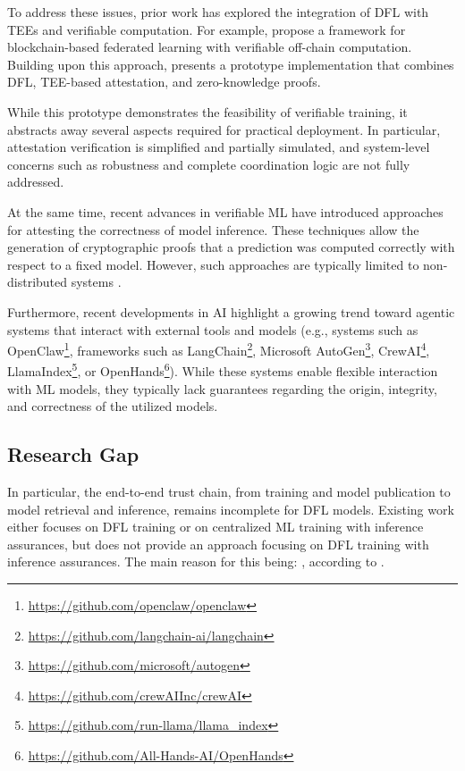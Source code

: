 To address these issues, prior work has explored the integration of \ac{DFL} with \acp{TEE} and verifiable computation. For example, \cite{heiss2022verifiable, 10634412} propose a framework for blockchain-based federated learning with verifiable off-chain computation. Building upon this approach, \cite{hartmann2024dfl} presents a prototype implementation that combines \ac{DFL}, \ac{TEE}-based attestation, and zero-knowledge proofs.

While this prototype demonstrates the feasibility of verifiable training, it abstracts away several aspects required for practical deployment. In particular, attestation verification is simplified and partially simulated, and system-level concerns such as robustness and complete coordination logic are not fully addressed.

At the same time, recent advances in verifiable \ac{ML} have introduced approaches for attesting the correctness of model inference. These techniques allow the generation of cryptographic proofs that a prediction was computed correctly with respect to a fixed model. However, such approaches are typically limited to non-distributed systems \cite{10.1145/3627703.3650088, south2024verifiableevaluationsmachinelearning}.


Furthermore, recent developments in \ac{AI} highlight a growing trend toward agentic systems that interact with external tools and models (e.g., systems such as OpenClaw\footnote{\url{https://github.com/openclaw/openclaw}}, frameworks such as LangChain\footnote{\url{https://github.com/langchain-ai/langchain}}, Microsoft AutoGen\footnote{\url{https://github.com/microsoft/autogen}}, CrewAI\footnote{\url{https://github.com/crewAIInc/crewAI}}, LlamaIndex\footnote{\url{https://github.com/run-llama/llama_index}}, or OpenHands\footnote{\url{https://github.com/All-Hands-AI/OpenHands}}). While these systems enable flexible interaction with \ac{ML} models, they typically lack guarantees regarding the origin, integrity, and correctness of the utilized models.

\subsection{Research Gap}

In particular, the end-to-end trust chain, from training and model publication to model retrieval and inference, remains incomplete for \ac{DFL} models. Existing work either focuses on \ac{DFL} training or on centralized \ac{ML} training with inference assurances, but does not provide an approach focusing on \ac{DFL} training with inference assurances. The main reason for this being: , according to \cite{lian2017can}.


